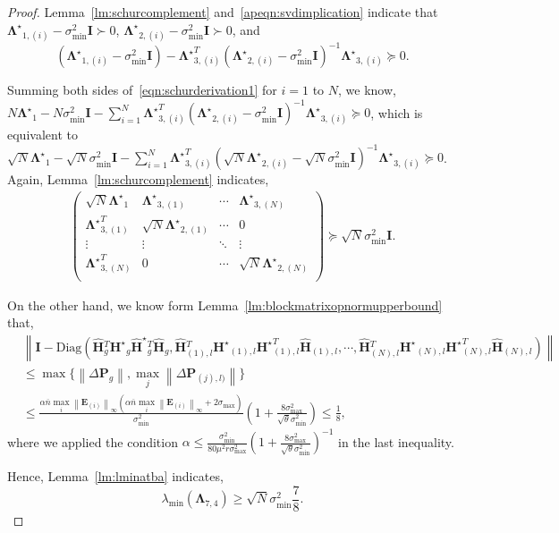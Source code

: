 \documentclass[twoside,11pt]{article}
\newcommand{\norm}[1]{\left\lVert#1\right\rVert}
\newcommand{\matE}{\mathbf{E}}
\newcommand{\hmatHst}{{\hat{\mathbf{H}}}^{\star}{}}
\newcommand{\hmatH}{{\hat{\mathbf{H}}}{}}
\newcommand{\matHst}{{\mathbf{H}^\star}}
\newcommand{\matI}{\mathbf{I}}
\newcommand{\matP}{\mathbf{P}}
\newcommand{\matLambda}{\mathbf{\Lambda}}
\newcommand{\matLambdast}{{\mathbf{\Lambda}^\star}}
\newcommand{\gop}{\sigma_{\max}}
\newcommand{\bn}{{\overline{n}}}
\newcommand{\abnb}{\alpha \bn\max_{i}\norm{\matE_{(i)}}_{\infty}}
\newcommand{\sms}{\sigma_{\min}^2}
\begin{document}
\begin{proof}
Lemma~\ref{lm:schurcomplement} and~\eqref{apeqn:svdimplication}
indicate that $\matLambdast_{1,(i)}-\sms\matI \succ 0$, $\matLambdast_{2,(i)}-\sms\matI \succ 0$, and \begin{equation}
\label{eqn:schurderivation1}
   \left(\matLambdast_{1,(i)}-\sms\matI\right)-\matLambdast_{3,(i)}^T\left(\matLambdast_{2,(i)}-\sms\matI\right)^{-1}\matLambdast_{3,(i)}\succeq 0. 
\end{equation} 

Summing both sides of~\eqref{eqn:schurderivation1} for $i=1$ to $N$, we know,
$
N\matLambdast_1-N\sms\matI -\sum_{i=1}^N\matLambdast_{3,(i)}^T\left(\matLambdast_{2,(i)}-\sms\matI\right)^{-1}\matLambdast_{3,(i)}\succeq 0
$, which is equivalent to $\sqrt{N}\matLambdast_1-\sqrt{N}\sms\matI -\sum_{i=1}^N\matLambdast_{3,(i)}^T\left(\sqrt{N}\matLambdast_{2,(i)}-\sqrt{N}\sms\matI\right)^{-1}\matLambdast_{3,(i)}\succeq 0$. Again, Lemma~\ref{lm:schurcomplement} indicates,
\begin{align*}
    \begin{pmatrix}
    \sqrt{N}\matLambdast_1 & \matLambdast_{3,(1)}&\cdots&\matLambdast_{3,(N)}\\
    \matLambdast_{3,(1)}^T&\sqrt{N}\matLambdast_{2,(1)}&\cdots&0\\
    \vdots&\vdots&\ddots&\vdots\\
    \matLambdast_{3,(N)}^T&0&\cdots&\sqrt{N}\matLambdast_{2,(N)}\\
   \end{pmatrix}\succeq\sqrt{N}\sms\matI.
\end{align*}

On the other hand, we know form Lemma~\ref{lm:blockmatrixopnormupperbound} that,
\begin{align*}
    &\norm{\matI-\text{Diag}\left(\hmatH_g^T\matHst_g\hmatHst_g^T\hmatH_g,\hmatH_{(1),l}^T\matHst_{(1),l}\matHst_{(1),l}^T\hmatH_{(1),l},\cdots,\hmatH_{(N),l}^T\matHst_{(N),l}\matHst_{(N),l}^T\hmatH_{(N),l} \right)}\\
    &\le \max\{\norm{\Delta\matP_{g}},\max_j \norm{\Delta\matP_{(j),l)}}\}\\
    &\le \frac{\abnb(\abnb+2\gop)}{\sms}\left(1+\frac{8\gop^2}{\sqrt{\theta}\sms}\right)\le \frac{1}{8},
\end{align*}
where we applied the condition $\alpha\le \frac{\sms}{80\mu^2 r\gop^2}\left(1+\frac{8\gop^2}{\sqrt{\theta}\sms}\right)^{-1}$ in the last inequality.

Hence, Lemma~\ref{lm:lminatba} indicates,
\begin{equation*}
    \lambda_{\min}\left(\matLambda_{7,4}\right)\ge \sqrt{N}\sms \frac{7}{8}.
\end{equation*}


\end{proof}
\end{document}
